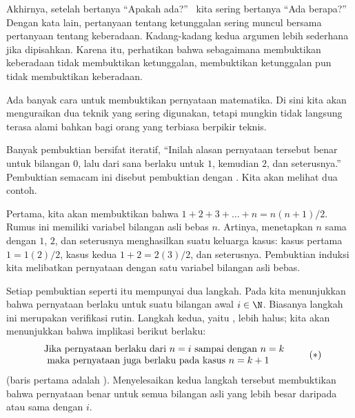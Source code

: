 Akhirnya, setelah bertanya
``Apakah ada?''\ %
kita sering bertanya ``Ada berapa?''
Dengan kata lain, pertanyaan tentang ketunggalan sering muncul bersama
pertanyaan tentang keberadaan.
Kadang-kadang kedua argumen lebih sederhana jika dipisahkan. Karena itu,
perhatikan bahwa sebagaimana membuktikan keberadaan tidak membuktikan
ketunggalan, membuktikan ketunggalan pun tidak membuktikan keberadaan.










%
Ada banyak cara untuk membuktikan pernyataan matematika.
Di sini kita akan menguraikan dua teknik yang sering digunakan, tetapi
mungkin tidak langsung terasa alami bahkan bagi orang yang terbiasa
berpikir teknis.
 

Banyak pembuktian bersifat iteratif,
``Inilah alasan pernyataan tersebut benar untuk bilangan \( 0 \),
lalu dari sana berlaku untuk \( 1 \), kemudian \( 2 \), dan seterusnya.''
Pembuktian semacam ini disebut pembuktian dengan
.
Kita akan melihat dua contoh.

Pertama, kita akan membuktikan bahwa \( 1+2+3+\dots+n=n(n+1)/2 \).
Rumus ini memiliki variabel bilangan asli bebas $n$. Artinya, menetapkan
$n$ sama dengan $1$, $2$, dan seterusnya menghasilkan suatu keluarga kasus:
kasus pertama $1=1(2)/2$, kasus kedua $1+2=2(3)/2$, dan seterusnya.
Pembuktian induksi kita melibatkan pernyataan dengan satu variabel bilangan
asli bebas.

Setiap pembuktian seperti itu mempunyai dua langkah.
Pada 
kita menunjukkan bahwa pernyataan berlaku untuk suatu bilangan awal
$i\in \N$. Biasanya langkah ini merupakan verifikasi rutin.
Langkah kedua, yaitu
,
lebih halus; kita akan menunjukkan bahwa implikasi berikut berlaku:
\begin{equation*}
  \begin{tabular}{l}
    \text{Jika pernyataan berlaku dari $n=i$ sampai dengan~$n=k$} 
     \\
    \text{\ maka pernyataan juga berlaku pada kasus $n=k+1$}
  \end{tabular}
  \tag{$*$}
\end{equation*}
(baris pertama adalah
).
Menyelesaikan kedua langkah tersebut membuktikan bahwa pernyataan benar
untuk semua bilangan asli yang lebih besar daripada atau sama dengan $i$.

